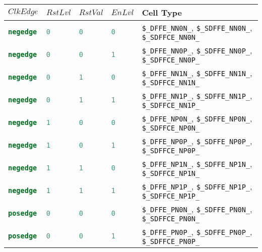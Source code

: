 \begin{table}[t]
\begin{tabular}[t]{lllll}
$ClkEdge$ & $RstLvl$ & $RstVal$ & $EnLvl$ & Cell Type \\
\hline
\lstinline[language=Verilog];negedge; & \lstinline[language=Verilog];0; & \lstinline[language=Verilog];0; & \lstinline[language=Verilog];0; & {\tt \$\_DFFE\_NN0N\_}, {\tt \$\_SDFFE\_NN0N\_}, {\tt \$\_SDFFCE\_NN0N\_} \\
\lstinline[language=Verilog];negedge; & \lstinline[language=Verilog];0; & \lstinline[language=Verilog];0; & \lstinline[language=Verilog];1; & {\tt \$\_DFFE\_NN0P\_}, {\tt \$\_SDFFE\_NN0P\_}, {\tt \$\_SDFFCE\_NN0P\_} \\
\lstinline[language=Verilog];negedge; & \lstinline[language=Verilog];0; & \lstinline[language=Verilog];1; & \lstinline[language=Verilog];0; & {\tt \$\_DFFE\_NN1N\_}, {\tt \$\_SDFFE\_NN1N\_}, {\tt \$\_SDFFCE\_NN1N\_} \\
\lstinline[language=Verilog];negedge; & \lstinline[language=Verilog];0; & \lstinline[language=Verilog];1; & \lstinline[language=Verilog];1; & {\tt \$\_DFFE\_NN1P\_}, {\tt \$\_SDFFE\_NN1P\_}, {\tt \$\_SDFFCE\_NN1P\_} \\
\lstinline[language=Verilog];negedge; & \lstinline[language=Verilog];1; & \lstinline[language=Verilog];0; & \lstinline[language=Verilog];0; & {\tt \$\_DFFE\_NP0N\_}, {\tt \$\_SDFFE\_NP0N\_}, {\tt \$\_SDFFCE\_NP0N\_} \\
\lstinline[language=Verilog];negedge; & \lstinline[language=Verilog];1; & \lstinline[language=Verilog];0; & \lstinline[language=Verilog];1; & {\tt \$\_DFFE\_NP0P\_}, {\tt \$\_SDFFE\_NP0P\_}, {\tt \$\_SDFFCE\_NP0P\_} \\
\lstinline[language=Verilog];negedge; & \lstinline[language=Verilog];1; & \lstinline[language=Verilog];1; & \lstinline[language=Verilog];0; & {\tt \$\_DFFE\_NP1N\_}, {\tt \$\_SDFFE\_NP1N\_}, {\tt \$\_SDFFCE\_NP1N\_} \\
\lstinline[language=Verilog];negedge; & \lstinline[language=Verilog];1; & \lstinline[language=Verilog];1; & \lstinline[language=Verilog];1; & {\tt \$\_DFFE\_NP1P\_}, {\tt \$\_SDFFE\_NP1P\_}, {\tt \$\_SDFFCE\_NP1P\_} \\
\lstinline[language=Verilog];posedge; & \lstinline[language=Verilog];0; & \lstinline[language=Verilog];0; & \lstinline[language=Verilog];0; & {\tt \$\_DFFE\_PN0N\_}, {\tt \$\_SDFFE\_PN0N\_}, {\tt \$\_SDFFCE\_PN0N\_} \\
\lstinline[language=Verilog];posedge; & \lstinline[language=Verilog];0; & \lstinline[language=Verilog];0; & \lstinline[language=Verilog];1; & {\tt \$\_DFFE\_PN0P\_}, {\tt \$\_SDFFE\_PN0P\_}, {\tt \$\_SDFFCE\_PN0P\_} \\

\end{tabular}
\end{table}
